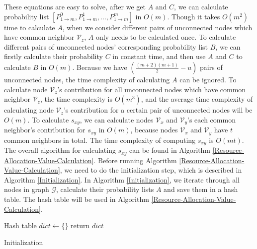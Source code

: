\documentclass[\main/thesis.tex]{subfiles}
\begin{document}
These equations are easy to solve, after we get $A$ and $C$, we can calculate probability list $[P_{1\rightarrow m}^0, P_{1\rightarrow m}^1, ..., P_{1\rightarrow m}^{m}]$ in $O(m)$. Though it takes $O(m^2)$ time to calculate $A$, when we consider different pairs of unconnected nodes which have common neighbor $\mathcal{V}_z$, $A$ only needs to be calculated once. To calculate different pairs of unconnected nodes' corresponding probability list $B$, we can firstly calculate their probability $C$ in constant time, and then use $A$ and $C$ to calculate $B$ in $O(m)$. Because we have $(\frac{(m+2)(m+1)}{2}-u)$ pairs of unconnected nodes, the time complexity of calculating $A$ can be ignored. To calculate node $\mathcal{V}_z$'s contribution for all unconnected nodes which have common neighbor $\mathcal{V}_z$, the time complexity is $O(m^3)$, and the average time complexity of calculating node $\mathcal{V}_z$'s contribution for a certain pair of unconnected nodes will be $O(m)$. To calculate $s_{xy}$, we can calculate nodes $\mathcal{V}_x$ and $\mathcal{V}_y$'s each common neighbor's contribution for $s_{xy}$ in $O(m)$, because nodes $\mathcal{V}_x$ and $\mathcal{V}_y$ have $t$ common neighbors in total. The time complexity of computing $s_{xy}$ is $O(mt)$. The overall algorithm for calculating $s_{xy}$ can be found in Algorithm \ref{Resource-Allocation-Value-Calculation}. Before running Algorithm \ref{Resource-Allocation-Value-Calculation}, we need to do the initialization step, which is described in Algorithm \ref{Initialization}. In Algorithm \ref{Initialization}, we iterate through all nodes in graph $\mathcal{G}$, calculate their probability lists $A$ and save them in a hash table. The hash table will be used in Algorithm \ref{Resource-Allocation-Value-Calculation}.

\begin{algorithm}
Hash table $dict \leftarrow \{\}$\;
return $dict$\;
\caption{Initialization}
\label{Initialization}
\end{algorithm}
\end{document}
